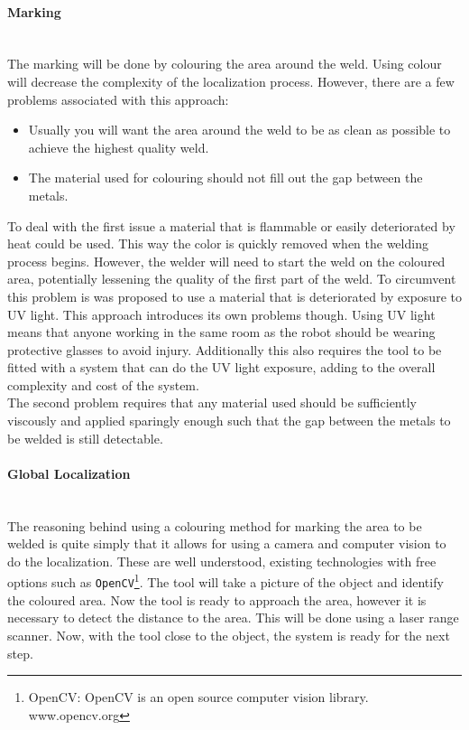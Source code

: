 \paragraph{Marking}~~\\
The marking will be done by colouring the area around the weld. Using colour will decrease the complexity of the localization process. However, there are a few problems associated with this approach: 
\begin{itemize}
	\item[] Usually you will want the area around the weld to be as clean as possible to achieve the highest quality weld.
	\item[] The material used for colouring should not fill out the gap between the metals.
\end{itemize}
To deal with the first issue a material that is flammable or easily deteriorated by heat could be used. This way the color is quickly removed when the welding process begins. However, the welder will need to start the weld on the coloured area, potentially lessening the quality of the first part of the weld. To circumvent this problem is was proposed to use a material that is deteriorated by exposure to UV light. This approach introduces its own problems though. Using UV light means that anyone working in the same room as the robot should be wearing protective glasses to avoid injury. Additionally this also requires the tool to be fitted with a system that can do the UV light exposure, adding to the overall complexity and cost of the system.\\
The second problem requires that any material used should be sufficiently viscously and applied sparingly enough such that the gap between the metals to be welded is still detectable.
\paragraph{Global Localization}~~\\
The reasoning behind using a colouring method for marking the area to be welded is quite simply that it allows for using a camera and computer vision to do the localization. These are well understood, existing technologies with free options such as \texttt{OpenCV}\footnote{OpenCV: OpenCV is an open source computer vision library. www.opencv.org}. The tool will take a picture of the object and identify the coloured area. Now the tool is ready to approach the area, however it is necessary to detect the distance to the area. This will be done using a laser range scanner. Now, with the tool close to the object, the system is ready for the next step.

